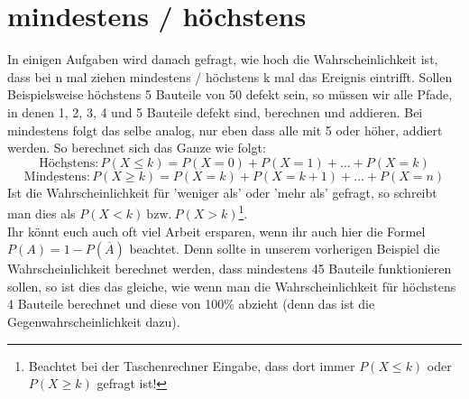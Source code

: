 \section{mindestens / höchstens}
In einigen Aufgaben wird danach gefragt, wie hoch die Wahrscheinlichkeit ist, dass bei n mal ziehen mindestens / höchstens k mal das Ereignis eintrifft. Sollen Beispielsweise höchstens 5 Bauteile von 50 defekt sein, so müssen wir alle Pfade, in denen 1, 2, 3, 4 und 5 Bauteile defekt sind, berechnen und addieren. Bei mindestens folgt das selbe analog, nur eben dass alle mit 5 oder höher, addiert werden. So berechnet sich das Ganze wie folgt:
\[\mathrm{\underline{Höchstens}: }P(X\leq k)=P(X=0)+P(X=1)+\ldots +P(X=k)\]
\[\mathrm{\underline{Mindestens}: }P(X\geq k)=P(X=k)+P(X=k+1)+\ldots +P(X=n)\]
Ist die Wahrscheinlichkeit für 'weniger als' oder 'mehr als' gefragt, so schreibt man dies als \(P(X<k)\mathrm{\ bzw.\ }P(X>k)\)\footnote{Beachtet bei der Taschenrechner Eingabe, dass dort immer $P(X\leq k)$ oder $P(X\geq k)$ gefragt ist!}.\\
Ihr könnt euch auch oft viel Arbeit ersparen, wenn ihr auch hier die Formel \(P(A)=1-P(\overline{A})\) beachtet. Denn sollte in unserem vorherigen Beispiel die Wahrscheinlichkeit berechnet werden, dass mindestens 45 Bauteile funktionieren sollen, so ist dies das gleiche, wie wenn man die Wahrscheinlichkeit für höchstens 4 Bauteile berechnet und diese von 100\% abzieht (denn das ist die Gegenwahrscheinlichkeit dazu).
